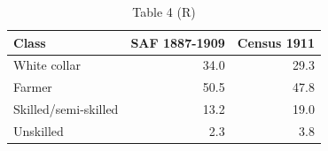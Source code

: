 \begin{table}

\caption{Table 4 (R)}
\centering
\begin{tabular}[t]{lrr}
\toprule
Class & SAF 1887-1909 & Census 1911\\
\midrule
White collar & 34.0 & 29.3\\
Farmer & 50.5 & 47.8\\
Skilled/semi-skilled & 13.2 & 19.0\\
Unskilled & 2.3 & 3.8\\
\bottomrule
\end{tabular}
\end{table}
